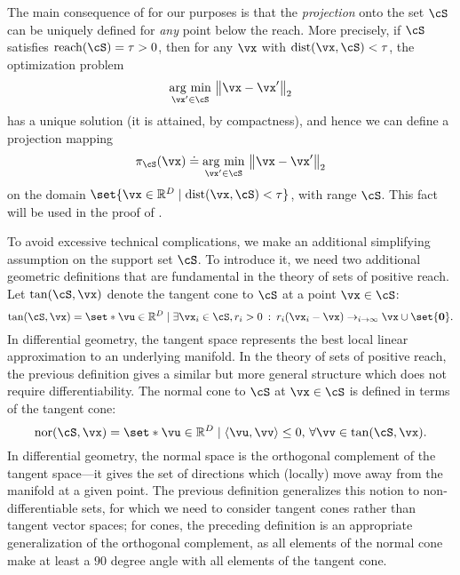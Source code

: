 \documentclass[../../book-main.tex]{subfiles}
\begin{document}
The main consequence of  for our purposes is
that the \textit{projection} onto the set $\cS$ can be uniquely defined for
\textit{any} point below the reach. More precisely, if $\cS$ satisfies
$\mathrm{reach}(\cS) = \tau > 0$, then for any $\vx$ with $\dist(\vx, \cS)
< \tau$, the optimization problem
\begin{equation}
    \argmin_{\vx' \in \cS}\, \norm*{\vx - \vx'}_2
\end{equation}
has a unique solution (it is attained, by compactness), and hence we can define
a projection mapping
\begin{equation}
    \pi_{\cS}(\vx) \doteq
    \argmin_{\vx' \in \cS}\, \norm*{\vx - \vx'}_2
\end{equation}
on the domain $\set{\vx \in \R^D \given \dist(\vx, \cS) < \tau}$, with range
$\cS$. This fact will be used in the proof of
.

To avoid excessive technical complications, we make an additional simplifying
assumption on the support set $\cS$. To introduce it, we need two additional
geometric definitions that are fundamental in the theory of sets of positive
reach.
Let $\mathrm{tan}(\cS, \vx)$ denote the tangent cone to $\cS$ at a point $\vx
\in \cS$:
\begin{equation}\label{eq:tangent-cone}
    \mathrm{tan}(\cS, \vx) = \set*{\vu \in \R^D \mid \exists \vx_i \in \cS, r_i
    > 0 \::\: r_i(\vx_i - \vx) \to_{i \to \infty} \vx} \cup \set{\Zero}.
\end{equation}
In differential geometry, the tangent space represents the best local linear
approximation to an underlying manifold. In the theory of sets of positive
reach, the previous definition gives a similar but more general structure which
does not require differentiability.
The normal cone to $\cS$ at $\vx \in \cS$ is defined in terms of the tangent
cone:
\begin{equation}\label{eq:normal-cone}
    \mathrm{nor}(\cS, \vx) = \set*{\vu \in \R^D \mid \ip{\vu}{\vv} \leq 0,\,
    \forall \vv \in \mathrm{tan}(\cS, \vx)}.
\end{equation}
In differential geometry, the normal space is the orthogonal complement of the
tangent space---it gives the set of directions which (locally) move away from
the manifold at a given point. The previous definition generalizes this notion
to non-differentiable sets, for which we need to consider tangent cones rather
than tangent vector spaces; for cones, the preceding definition is an
appropriate generalization of the orthogonal complement, as all elements of the
normal cone make at least a $90$ degree angle with all elements of the tangent
cone.
\end{document}
